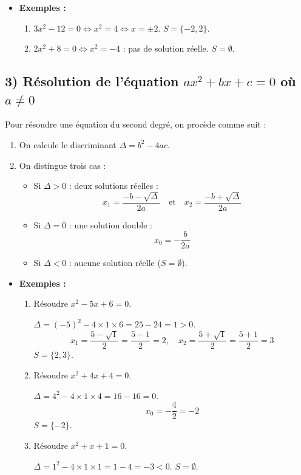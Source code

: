 \documentclass[12pt,a4paper]{article}
\newcounter{solution}
\begin{document}
\begin{itemize}
    \item \textbf{Exemples :}
    \begin{enumerate}[label=\arabic*)]
        \item $3x^2 - 12 = 0 \iff x^2 = 4 \iff x = \pm 2$. \quad $S = \{-2, 2\}$.
        \item $2x^2 + 8 = 0 \iff x^2 = -4$ : pas de solution réelle. \quad $S = \emptyset$.
    \end{enumerate}
\end{itemize}

\subsection*{\color{myred} 3) Résolution de l'équation $ax^2 + bx + c = 0$ où $a \neq 0$}
Pour résoudre une équation du second degré, on procède comme suit :

\begin{enumerate}
    \item On calcule le discriminant $\Delta = b^2 - 4ac$.
    \item On distingue trois cas :
    \begin{itemize}
        \item Si $\Delta > 0$ : deux solutions réelles :
        \[
        x_1 = \dfrac{-b - \sqrt{\Delta}}{2a} \quad \text{et} \quad x_2 = \dfrac{-b + \sqrt{\Delta}}{2a}
        \]
        \item Si $\Delta = 0$ : une solution double :
        \[
        x_0 = -\dfrac{b}{2a}
        \]
        \item Si $\Delta < 0$ : aucune solution réelle ($S = \emptyset$).
    \end{itemize}
\end{enumerate}

\begin{itemize}
    \item \textbf{Exemples :}
    \begin{enumerate}[label=\arabic*)]
        \item Résoudre $x^2 - 5x + 6 = 0$.
        
        $\Delta = (-5)^2 - 4 \times 1 \times 6 = 25 - 24 = 1 > 0$.
        \[
        x_1 = \dfrac{5 - \sqrt{1}}{2} = \dfrac{5-1}{2} = 2, \quad
        x_2 = \dfrac{5 + \sqrt{1}}{2} = \dfrac{5+1}{2} = 3
        \]
        $S = \{2, 3\}$.
        
        \item Résoudre $x^2 + 4x + 4 = 0$.
        
        $\Delta = 4^2 - 4 \times 1 \times 4 = 16 - 16 = 0$.
        \[
        x_0 = -\dfrac{4}{2} = -2
        \]
        $S = \{-2\}$.
        
        \item Résoudre $x^2 + x + 1 = 0$.
        
        $\Delta = 1^2 - 4 \times 1 \times 1 = 1 - 4 = -3 < 0$.
        $S = \emptyset$.
    \end{enumerate}
\end{itemize}
\end{document}
